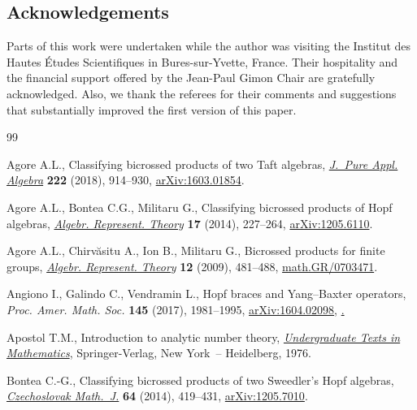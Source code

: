 \documentclass[10pt,a4paper]{amsart}
\numberwithin{equation}{section}
\begin{document}
\subsection*{Acknowledgements}

Parts of this work were undertaken while the author was visiting the Institut des Hautes \'{E}tudes Scientifiques in Bures-sur-Yvette, France. Their hospitality and the financial support offered by the Jean-Paul Gimon Chair are gratefully acknowledged. Also, we thank the referees for their comments and suggestions that substantially improved the first version of this paper.


\begin{thebibliography}{99}
\footnotesize\itemsep=0pt

Agore A.L., Classifying bicrossed products of two {T}aft algebras,
 \href{https://doi.org/10.1016/j.jpaa.2017.05.014}{\textit{J.~Pure Appl. Algebra}} \textbf{222} (2018), 914--930,
 \href{https://arxiv.org/abs/1603.01854}{arXiv:1603.01854}.

Agore A.L., Bontea C.G., Militaru G., Classifying bicrossed products of {H}opf
 algebras, \href{https://doi.org/10.1007/s10468-012-9396-5}{\textit{Algebr. Represent. Theory}} \textbf{17} (2014), 227--264,
 \href{https://arxiv.org/abs/1205.6110}{arXiv:1205.6110}.

Agore A.L., Chirv\u{a}situ A., Ion B., Militaru G., Bicrossed products for
 finite groups, \href{https://doi.org/10.1007/s10468-009-9145-6}{\textit{Algebr. Represent. Theory}} \textbf{12} (2009),
 481--488, \href{https://arxiv.org/abs/math.GR/0703471}{math.GR/0703471}.

Angiono I., Galindo C., Vendramin L., Hopf braces and {Y}ang--{B}axter
 operators, \textit{Proc. Amer. Math. Soc.} \textbf{145} (2017), 1981--1995,
 \href{https://arxiv.org/abs/#2}{arXiv:1604.02098}, \href{https://doi.org/10.1090/proc/13395}.

Apostol T.M., Introduction to analytic number theory, \href{https://doi.org/10.1007/978-1-4757-5579-4}{\textit{Undergraduate Texts in Mathematics}}, Springer-Verlag, New York~-- Heidelberg, 1976.

Bontea C.-G., Classifying bicrossed products of two {S}weedler's {H}opf
 algebras, \href{https://doi.org/10.1007/s10587-014-0109-6}{\textit{Czechoslovak Math.~J.}} \textbf{64} (2014), 419--431,
 \href{https://arxiv.org/abs/1205.7010}{arXiv:1205.7010}.


\end{thebibliography}
\end{document}
